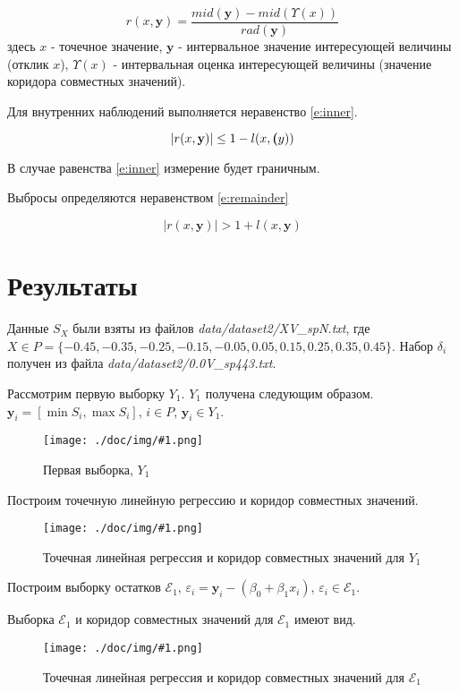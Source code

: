 \documentclass[a4paper,12pt]{article}
\newcommand{\plot}[3]{
    \begin{figure}[H]
        \begin{center}
            \texttt{[image: ./doc/img/\#1.png]}
            \caption{#2}
            \label{#3}
        \end{center}
    \end{figure}
}
\begin{document}
    \label{e:residual}
    \begin{equation}
        r(x, \textbf{y}) = \frac{mid(\textbf{y}) - mid(\Upsilon(x))}{rad(\textbf{y})}
    \end{equation}
    здесь $ x $ - точечное значение, $ \textbf{y} $ - интервальное значение интересующей величины (отклик $ x $),
    $ \Upsilon(x) $ - интервальная оценка интересующей величины (значение коридора совместных значений).

    Для внутренних наблюдений выполняется неравенство \ref{e:inner}.
    
    \label{e:inner}
    \begin{equation}
        |r(x, \textbf{y})| \leq 1 - l(x, \textbf(y))
    \end{equation}

    В случае равенства \ref{e:inner} измерение будет граничным.

    Выбросы определяются неравенством \ref{e:remainder}
    
    \label{e:remainder}
    \begin{equation}
        |r(x, \textbf{y})| > 1 + l(x, \textbf{y})
    \end{equation}

    \section{Результаты}
    \quad Данные $ S_X $ были взяты из файлов \textsl{data/dataset2/XV\_spN.txt}, \newline
    где $ X \in P = \{-0.45, -0.35, -0.25, -0.15, -0.05, 0.05, 0.15, 0.25, 0.35, 0.45 \} $.
    Набор $ \delta_i $ получен из файла \textsl{data/dataset2/0.0V\_sp443.txt}.

    Рассмотрим первую выборку $ Y_1 $. $ Y_1 $ получена следующим образом.
    $ \textbf{y}_i = [\min{S_i}, \max{S_i}]$, $ i \in P $, $ \textbf{y}_i \in Y_1 $.
    \plot{SampleX1}{Первая выборка, $ Y_1 $}{p:sampleX1}

    Построим точечную линейную регрессию и коридор совместных значений.
    \plot{InformSetCorridorX1}{Точечная линейная регрессия и коридор совместных значений для $ Y_1 $}{p:informSetCorridorX1}

    Построим выборку остатков $ \mathcal{E}_1 $, $ \varepsilon_i = \textbf{y}_i - (\beta_0 + \beta_1 x_i) $,
    $ \varepsilon_i \in \mathcal{E}_1 $.

    Выборка $ \mathcal{E}_1 $ и коридор совместных значений для $ \mathcal{E}_1 $ имеют вид.
    \plot{InformSetCorridorRemX1}{Точечная линейная регрессия и коридор совместных значений для $ \mathcal{E}_1 $}{p:informSetCorridorRemX1}
\end{document}
